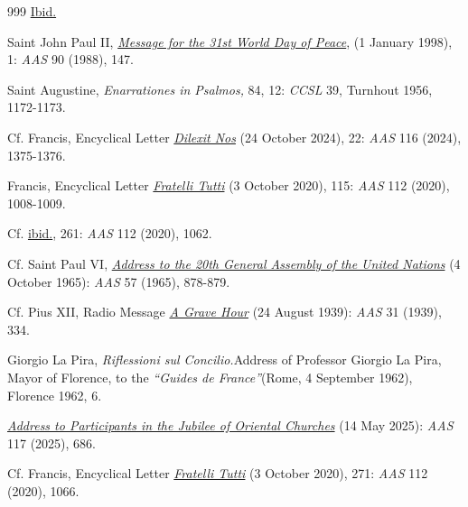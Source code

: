 \documentclass{article}
\begin{document}
\begin{thebibliography}{999}
 \href{https://www.vatican.va/content/leo-xiv/en/speeches/2025/may/documents/20250512-media.html}{Ibid.}

 Saint John Paul II, \href{https://www.vatican.va/content/john-paul-ii/en/messages/peace/documents/hf_jp-ii_mes_08121997_xxxi-world-day-for-peace.html}{\emph{Message for the 31st World Day of Peace}}, (1 January 1998), 1: \emph{AAS} 90 (1988), 147.

 Saint Augustine, \emph{Enarrationes in Psalmos,} 84, 12: \emph{CCSL} 39, Turnhout 1956, 1172-1173.

 Cf. Francis, Encyclical Letter \href{https://www.vatican.va/content/francesco/en/encyclicals/documents/20241024-enciclica-dilexit-nos.html}{\emph{Dilexit Nos}} (24 October 2024), 22: \emph{AAS} 116 (2024), 1375-1376.

 Francis, Encyclical Letter \href{https://www.vatican.va/content/francesco/en/encyclicals/documents/papa-francesco_20201003_enciclica-fratelli-tutti.html}{\emph{Fratelli Tutti}} (3 October 2020), 115: \emph{AAS} 112 (2020), 1008-1009.

 Cf. \href{https://www.vatican.va/content/francesco/en/encyclicals/documents/papa-francesco_20201003_enciclica-fratelli-tutti.html}{ibid.}, 261: \emph{AAS} 112 (2020), 1062.

 Cf. Saint Paul VI, \href{https://www.vatican.va/content/paul-vi/en/speeches/1965/documents/hf_p-vi_spe_19651004_united-nations.html}{\emph{Address to the 20th General Assembly of the United Nations}} (4 October 1965): \emph{AAS} 57 (1965), 878-879.

 Cf. Pius XII, Radio Message \href{https://www.vatican.va/content/john-paul-ii/en/messages/pont_messages/1989/documents/hf_jp-ii_mes_19890827_anniv-ii-guerra-mondiale.html}{\emph{A Grave Hour}} (24 August 1939): \emph{AAS} 31 (1939), 334.

 Giorgio La Pira, \emph{Riflessioni sul Concilio.}Address of Professor Giorgio La Pira, Mayor of Florence, to the \emph{``Guides de France''}(Rome, 4 September 1962), Florence 1962, 6.

 \href{https://www.vatican.va/content/leo-xiv/en/speeches/2025/may/documents/20250514-giubileo-chiese-orientali.html}{\emph{Address to Participants in the Jubilee of Oriental Churches}} (14 May 2025): \emph{AAS} 117 (2025), 686.

 Cf. Francis, Encyclical Letter \href{https://www.vatican.va/content/francesco/en/encyclicals/documents/papa-francesco_20201003_enciclica-fratelli-tutti.html}{\emph{Fratelli Tutti}} (3 October 2020), 271: \emph{AAS} 112 (2020), 1066.


\end{thebibliography}
\end{document}
